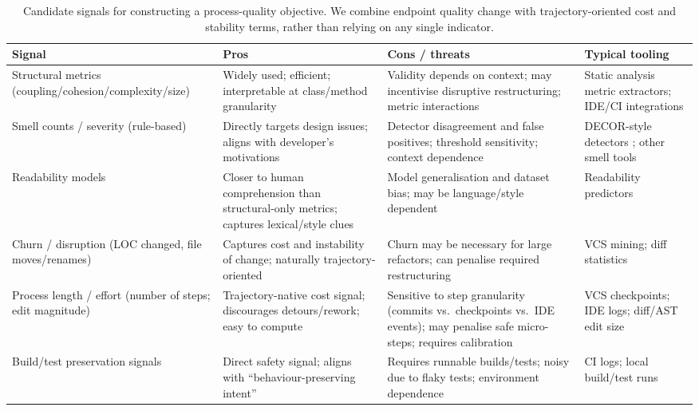 \begin{table}[H]
\centering
\small
\begin{tabular}{L{0.19\textwidth} L{0.26\textwidth} L{0.28\textwidth} L{0.19\textwidth}}
\hline
\textbf{Signal} & \textbf{Pros} & \textbf{Cons / threats} & \textbf{Typical tooling} \\
\hline
Structural metrics (coupling/cohesion/\newline complexity/size) &
Widely used; efficient; interpretable at class/method granularity &
Validity depends on context; may incentivise disruptive restructuring; metric interactions &
Static analysis metric extractors; IDE/CI integrations \\
\hline
Smell counts / severity (rule-based) &
Directly targets design issues; aligns with developer's motivations &
Detector disagreement and false positives; threshold sensitivity; context dependence &
DECOR-style detectors \cite{moha2010decor}; other smell tools \cite{paiva2017evaluation} \\
\hline
Readability models &
Closer to human comprehension than structural-only metrics; captures lexical/style clues &
Model generalisation and dataset bias; may be language/style dependent &
Readability predictors \cite{scalabrino2018readability} \\
\hline
Churn / disruption (LOC changed, file moves/renames) &
Captures cost and instability of change; naturally trajectory-oriented &
Churn may be necessary for large refactors; can penalise required restructuring &
VCS mining; diff statistics \\
\hline
Process length / effort (number of steps; edit magnitude) &
Trajectory-native cost signal; discourages detours/rework; easy to compute &
Sensitive to step granularity (commits vs.\ checkpoints vs.\ IDE events); may penalise safe micro-steps; requires calibration &
VCS checkpoints; IDE logs; diff/AST edit size \\
\hline
Build/test preservation signals &
Direct safety signal; aligns with ``behaviour-preserving intent'' &
Requires runnable builds/tests; noisy due to flaky tests; environment dependence &
CI logs; local build/test runs \\
\hline
\end{tabular}
\caption{Candidate signals for constructing a process-quality objective. We combine endpoint quality change with trajectory-oriented cost and stability terms, rather than relying on any single indicator.}
\label{tab:metric-candidates}
\end{table}


